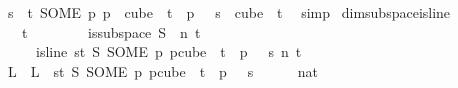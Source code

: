 \begin{isabellebody}
\ {\isachardoublequoteopen}{\isasymforall}s\ {\isasymin}\ {\isacharbraceleft}{\kern0pt}{\isachardot}{\kern0pt}{\isachardot}{\kern0pt}{\isacharless}{\kern0pt}t{\isacharbraceright}{\kern0pt}{\isachardot}{\kern0pt}\ {\isacharparenleft}{\kern0pt}SOME\ p{\isachardot}{\kern0pt}\ p\ {\isasymin}\ cube\ {}\ t\ {\isasymand}\ p\ {}\ {\isacharequal}{\kern0pt}\ s{\isacharparenright}{\kern0pt}\ {\isasymin}\ cube\ {}\ t{\isachardoublequoteclose}\ \isamarkupfalse%
\ simp\isanewline
{}\isamarkupfalse%
%
\endisatagproof
{\isafoldproof}%
%
\isadelimproof
\isanewline
%
\endisadelimproof
\isanewline
{}\isamarkupfalse%
\ dim{}{\isacharunderscore}{\kern0pt}subspace{\isacharunderscore}{\kern0pt}is{\isacharunderscore}{\kern0pt}line{\isacharcolon}{\kern0pt}\ \isanewline
\ \ \ {\isachardoublequoteopen}t\ {\isachargreater}{\kern0pt}\ {}{\isachardoublequoteclose}\ \isanewline
\ \ \ \ \ {\isachardoublequoteopen}is{\isacharunderscore}{\kern0pt}subspace\ S\ {}\ n\ t{\isachardoublequoteclose}\ \isanewline
\ \ \ \ \ {\isachardoublequoteopen}is{\isacharunderscore}{\kern0pt}line\ {\isacharparenleft}{\kern0pt}{\isasymlambda}s{\isasymin}{\isacharbraceleft}{\kern0pt}{\isachardot}{\kern0pt}{\isachardot}{\kern0pt}{\isacharless}{\kern0pt}t{\isacharbraceright}{\kern0pt}{\isachardot}{\kern0pt}\ S\ {\isacharparenleft}{\kern0pt}SOME\ p{\isachardot}{\kern0pt}\ p{\isasymin}cube\ {}\ t\ {\isasymand}\ p\ {}\ {\isacharequal}{\kern0pt}\ s{\isacharparenright}{\kern0pt}{\isacharparenright}{\kern0pt}\ n\ t{\isachardoublequoteclose}\isanewline
%
\isadelimproof
%
\endisadelimproof
%
\isatagproof
{}\isamarkupfalse%
{\isacharminus}{\kern0pt}\isanewline
\ \ \isamarkupfalse%
\ L\ \ {\isachardoublequoteopen}L\ {\isasymequiv}\ {\isacharparenleft}{\kern0pt}{\isasymlambda}s{\isasymin}{\isacharbraceleft}{\kern0pt}{\isachardot}{\kern0pt}{\isachardot}{\kern0pt}{\isacharless}{\kern0pt}t{\isacharbraceright}{\kern0pt}{\isachardot}{\kern0pt}\ S\ {\isacharparenleft}{\kern0pt}SOME\ p{\isachardot}{\kern0pt}\ p{\isasymin}cube\ {}\ t\ {\isasymand}\ p\ {}\ {\isacharequal}{\kern0pt}\ s{\isacharparenright}{\kern0pt}{\isacharparenright}{\kern0pt}{\isachardoublequoteclose}\isanewline
\ \ \isamarkupfalse%
\ {\isachardoublequoteopen}{\isacharbraceleft}{\kern0pt}{\isachardot}{\kern0pt}{\isachardot}{\kern0pt}{}{\isacharbraceright}{\kern0pt}\ {\isacharequal}{\kern0pt}\ {\isacharbraceleft}{\kern0pt}{}{\isacharcolon}{\kern0pt}{\isacharcolon}{\kern0pt}nat{\isacharcomma}{\kern0pt}\ {}{\isacharbraceright}{\kern0pt}{\isachardoublequoteclose}\ \isamarkupfalse%

\end{isabellebody}
